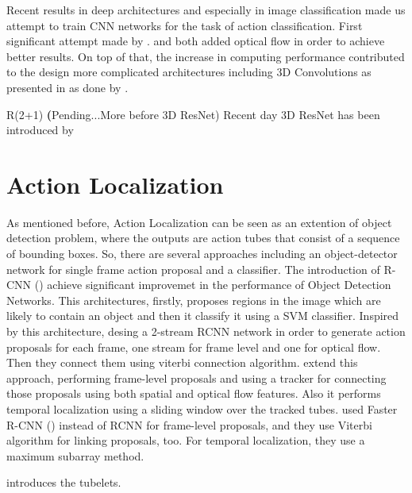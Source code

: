 Recent results in deep architectures and especially in image classification made us attempt to train CNN networks for
the task of action classification. First significant attempt made by \cite{6909619}.  %
 \cite{simonyan2014two} and \cite{DBLP:journals/corr/FeichtenhoferPZ16} both added optical flow in order to achieve better results.
On top of that, the increase  in computing performance contributed to the design more complicated architectures including
3D Convolutions as presented in \cite{6165309} as done by \cite{DBLP:journals/corr/TranBFTP14}.

R(2+1) \cite{DBLP:journals/corr/abs-1711-11248}
\textbf(Pending...More before 3D ResNet)
Recent day 3D ResNet has been introduced by \cite{Hara_2018_CVPR} 
\section{Action Localization}
As mentioned before, Action Localization can be seen as an extention of object detection problem, where the outputs are action tubes
that consist of a sequence of bounding boxes. So, there are several approaches including an object-detector network for single frame
action proposal and a classifier. The introduction of R-CNN (\cite{DBLP:journals/corr/GirshickDDM13}) achieve significant improvemet
in the performance of Object Detection Networks. This architectures, firstly, proposes regions in the image which are likely to
contain an object and then it classify it using a SVM classifier. Inspired by this architecture, \cite{DBLP:journals/corr/GkioxariM14}
desing a 2-stream RCNN network in order to generate action proposals for each frame, one stream for frame level and one for optical flow.
Then they  connect them using viterbi connection algorithm. \cite{DBLP:journals/corr/WeinzaepfelHS15} extend this approach, performing
frame-level proposals and using a tracker for connecting those proposals using both spatial and optical flow features. Also it performs
temporal localization using a sliding window over the tracked tubes. \cite{peng:hal-01349107} used Faster R-CNN (\cite{Ren:2015:FRT:2969239.2969250})
instead of RCNN for frame-level proposals, and they use Viterbi algorithm for linking proposals, too. For temporal localization, they
use a maximum subarray method.







\cite{6909495} introduces the tubelets.

